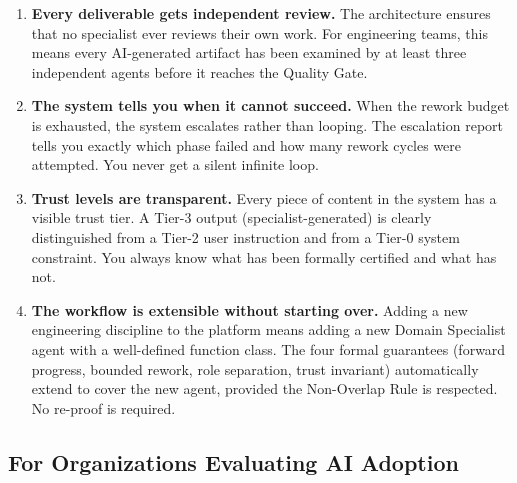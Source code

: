 \documentclass[12pt]{article}
\begin{document}
\begin{enumerate}
    \item \textbf{Every deliverable gets independent review.}
          The architecture ensures that no specialist ever reviews
          their own work.
          For engineering teams, this means every AI-generated artifact
          has been examined by at least three independent agents before
          it reaches the Quality Gate.

    \item \textbf{The system tells you when it cannot succeed.}
          When the rework budget is exhausted, the system escalates
          rather than looping.
          The escalation report tells you exactly which phase failed
          and how many rework cycles were attempted.
          You never get a silent infinite loop.

    \item \textbf{Trust levels are transparent.}
          Every piece of content in the system has a visible trust
          tier.
          A Tier-3 output (specialist-generated) is clearly
          distinguished from a Tier-2 user instruction and from a
          Tier-0 system constraint.
          You always know what has been formally certified and what
          has not.

    \item \textbf{The workflow is extensible without starting over.}
          Adding a new engineering discipline to the platform means
          adding a new Domain Specialist agent with a well-defined
          function class.
          The four formal guarantees (forward progress, bounded rework,
          role separation, trust invariant) automatically extend to
          cover the new agent, provided the Non-Overlap Rule is
          respected.
          No re-proof is required.
\end{enumerate}

\subsection{For Organizations Evaluating AI Adoption}
\end{document}

